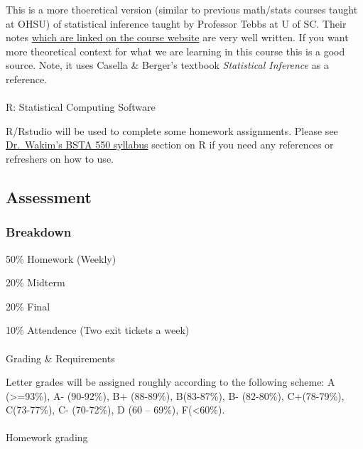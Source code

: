 \documentclass[
  letterpaper,
  DIV=11,
  numbers=noendperiod]{scrartcl}
\makeatletter
\let\oldparagraph\paragraph
\renewcommand{\paragraph}{
    \@ifstar
      \xxxParagraphStar
      \xxxParagraphNoStar
  }
\newcommand{\xxxParagraphStar}[1]{\oldparagraph*{#1}\mbox{}}
\newcommand{\xxxParagraphNoStar}[1]{\oldparagraph{#1}\mbox{}}
\makeatother
\begin{document}
This is a more thoeretical version (similar to previous math/stats
courses taught at OHSU) of statistical inference taught by Professor
Tebbs at U of SC. Their notes
\href{https://people.stat.sc.edu/Tebbs/stat713/index.htm}{which are
linked on the course website} are very well written. If you want more
theoretical context for what we are learning in this course this is a
good source. Note, it uses Casella \& Berger's textbook
\emph{Statistical Inference} as a reference.

\paragraph{R: Statistical Computing
Software}\label{r-statistical-computing-software}

R/Rstudio will be used to complete some homework assignments. Please see
\href{https://nwakim.github.io/BSTA_550_25F/syllabus.html}{Dr.~Wakim's
BSTA 550 syllabus} section on R if you need any references or refreshers
on how to use.

\subsection{Assessment}\label{assessment}

\subsubsection{Breakdown}\label{breakdown}

50\% Homework (Weekly)

20\% Midterm

20\% Final

10\% Attendence (Two exit tickets a week)

\paragraph{Grading \& Requirements}\label{grading-requirements}

Letter grades will be assigned roughly according to the following
scheme: A (\textgreater=93\%), A- (90-92\%), B+ (88-89\%), B(83-87\%),
B- (82-80\%), C+(78-79\%), C(73-77\%), C- (70-72\%), D (60 -- 69\%),
F(\textless60\%).

\paragraph{Homework grading}\label{homework-grading}
\end{document}
